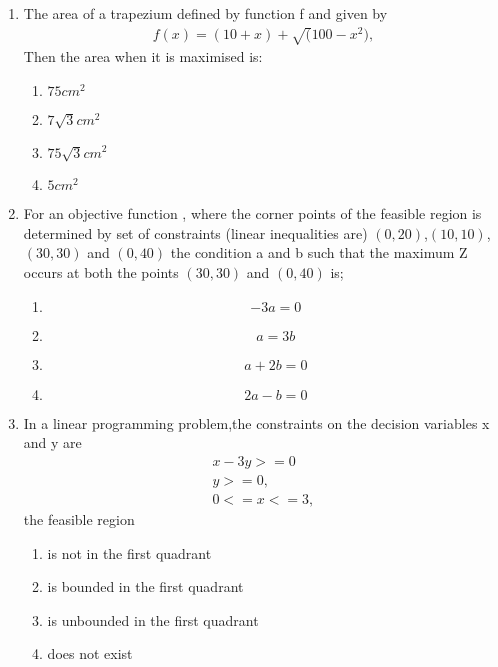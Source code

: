 \documentclass{article}
\begin{document}
\begin{enumerate}
\begin{enumerate}[label = (\Alph*)]
		\end{enumerate}
	\item The area of a trapezium  defined by function f and given by 
		\begin{align}
		\text{$f(x) = (10+x)+\sqrt(100-x^2)$},
		\end{align}
		Then the area when it is maximised is:
		\begin{enumerate}[label=(\Alph*)]
			\item $75cm^2$
			\item $7\sqrt{3}cm^2$
			\item $75\sqrt{3}cm^2$
			\item $5cm^2$
		\end{enumerate}
	\item For an objective function , where  the corner points of the feasible region is determined by set of constraints (linear inequalities are) $(0,20)$,$(10,10)$,$(30,30)$ and $(0,40)$ the condition a and b such that the maximum Z occurs at both the points $(30,30)$ and $(0,40)$ is;
		\begin{enumerate}[label=(\Alph*)]
			\item 
				$$-3a=0 $$
			\item 
				$$ a=3b $$
			\item 
				$$ a+2b=0 $$
			\item 
				$$ 2a-b=0 $$
		\end{enumerate}
	\item In a linear programming problem,the constraints on the decision variables x and y are 
		\begin{align}
		    x-3y>=0\\
		     y>=0,\\
		    0<=x<=3,
		\end{align}
		the feasible region 
		\begin{enumerate}[label=(\Alph*)]
			\item is not in the first quadrant
			\item is bounded in the first quadrant
			\item is unbounded in the first quadrant
			\item does not exist
		\end{enumerate}
 \end{enumerate}
 
\end{document}
